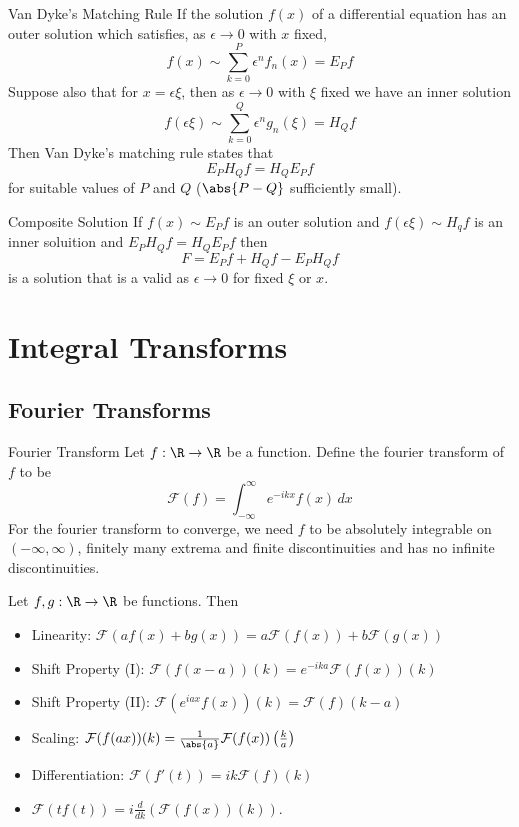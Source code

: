 \documentclass[a4paper]{article}
\begin{document}
\begin{prp}{Van Dyke's Matching Rule}{} If the solution $f(x)$ of a differential equation has an outer solution which satisfies, as $\epsilon\to 0$ with $x$ fixed, $$f(x)\sim\sum_{k=0}^P\epsilon^nf_n(x)=E_Pf$$ Suppose also that for $x=\epsilon\xi$, then as $\epsilon\to 0$ with $\xi$ fixed we have an inner solution $$f(\epsilon\xi)\sim\sum_{k=0}^Q\epsilon^ng_n(\xi)=H_Qf$$ Then Van Dyke's matching rule states that $$E_PH_Qf=H_QE_Pf$$ for suitable values of $P$ and $Q$ ($\abs{P-Q}$ sufficiently small). 
\end{prp}

\begin{prp}{Composite Solution}{} If $f(x)\sim E_Pf$ is an outer solution and $f(\epsilon\xi)\sim H_qf$ is an inner soluition and $E_PH_Qf=H_QE_Pf$ then $$F=E_Pf+H_Qf-E_PH_Qf$$ is a solution that is a valid as $\epsilon\to 0$ for fixed $\xi$ or $x$. 
\end{prp}

\pagebreak
\section{Integral Transforms}
\subsection{Fourier Transforms}
\begin{defn}{Fourier Transform}{} Let $f:\R\to\R$ be a function. Define the fourier transform of $f$ to be $$\mathcal{F}(f)=\int_{-\infty}^\infty e^{-ikx}f(x)\,dx$$ For the fourier transform to converge, we need $f$ to be absolutely integrable on $(-\infty,\infty)$, finitely many extrema and finite discontinuities and has no infinite discontinuities. 
\end{defn}

\begin{prp}{}{} Let $f,g:\R\to\R$ be functions. Then 
\begin{itemize}
\item Linearity: $\mathcal{F}(af(x)+bg(x))=a\mathcal{F}(f(x))+b\mathcal{F}(g(x))$
\item Shift Property (I): $\mathcal{F}(f(x-a))(k)=e^{-ika}\mathcal{F}(f(x))(k)$
\item Shift Property (II): $\mathcal{F}(e^{iax}f(x))(k)=\mathcal{F}(f)(k-a)$
\item Scaling: $\mathcal{F}(f(ax))(k)=\frac{1}{\abs{a}}\mathcal{F}(f(x))\left(\frac{k}{a}\right)$
\item Differentiation: $\mathcal{F}(f'(t))=ik\mathcal{F}(f)(k)$
\item $\mathcal{F}(tf(t))=i\frac{d}{dk}\left(\mathcal{F}(f(x))(k)\right)$. 
\end{itemize}
\end{prp}
\end{document}
